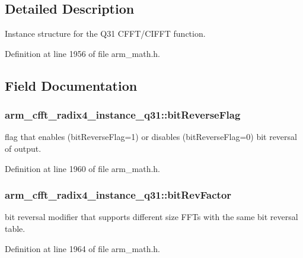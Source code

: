 \subsection{Detailed Description}
Instance structure for the Q31 C\-F\-F\-T/\-C\-I\-F\-F\-T function. 

Definition at line 1956 of file arm\-\_\-math.\-h.



\subsection{Field Documentation}
\hypertarget{structarm__cfft__radix4__instance__q31_a5a7c4f4c7b3fb655cbb2bc11ef160a2a}{
\subsubsection[{bit\-Reverse\-Flag}]{ arm\-\_\-cfft\-\_\-radix4\-\_\-instance\-\_\-q31\-::bit\-Reverse\-Flag}}\label{structarm__cfft__radix4__instance__q31_a5a7c4f4c7b3fb655cbb2bc11ef160a2a}
flag that enables (bit\-Reverse\-Flag=1) or disables (bit\-Reverse\-Flag=0) bit reversal of output. 

Definition at line 1960 of file arm\-\_\-math.\-h.

\hypertarget{structarm__cfft__radix4__instance__q31_a94d2fead4efa4d5eaae142bbe30b0e15}{
\subsubsection[{bit\-Rev\-Factor}]{ arm\-\_\-cfft\-\_\-radix4\-\_\-instance\-\_\-q31\-::bit\-Rev\-Factor}}\label{structarm__cfft__radix4__instance__q31_a94d2fead4efa4d5eaae142bbe30b0e15}
bit reversal modifier that supports different size F\-F\-Ts with the same bit reversal table. 

Definition at line 1964 of file arm\-\_\-math.\-h.

